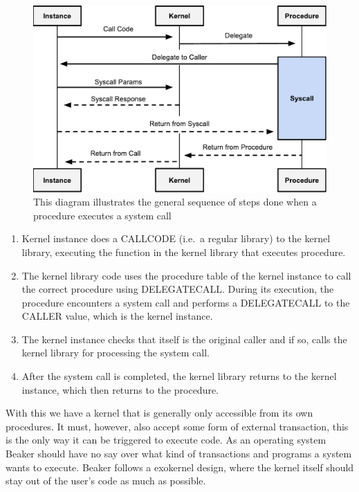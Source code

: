 \documentclass[english,a4paper]{article}
\begin{document}
\begin{figure}[htbp]
\centering
\includegraphics[width=1\textwidth]{media/SystemCalls.pdf}
\caption{This diagram illustrates the general sequence of steps
done when a procedure executes a system call}
\end{figure}

\begin{enumerate}
\def\labelenumi{\arabic{enumi}.}
\item
  Kernel instance does a CALLCODE (i.e.~a regular library) to the kernel
  library, executing the function in the kernel library that executes
  procedure.
\item
  The kernel library code uses the procedure table of the kernel
  instance to call the correct procedure using DELEGATECALL. During its
  execution, the procedure encounters a system call and performs a
  DELEGATECALL to the CALLER value, which is the kernel instance.
\item
  The kernel instance checks that itself is the original caller and if
  so, calls the kernel library for processing the system call.
\item
  After the system call is completed, the kernel library returns to the
  kernel instance, which then returns to the procedure.
\end{enumerate}

With this we have a kernel that is generally only accessible from its
own procedures. It must, however, also accept some form of external
transaction, this is the only way it can be triggered to execute code.
As an operating system Beaker should have no say over what kind of
transactions and programs a system wants to execute. Beaker follows a
exokernel design, where the kernel itself should stay out of the user's
code as much as possible.
\end{document}
